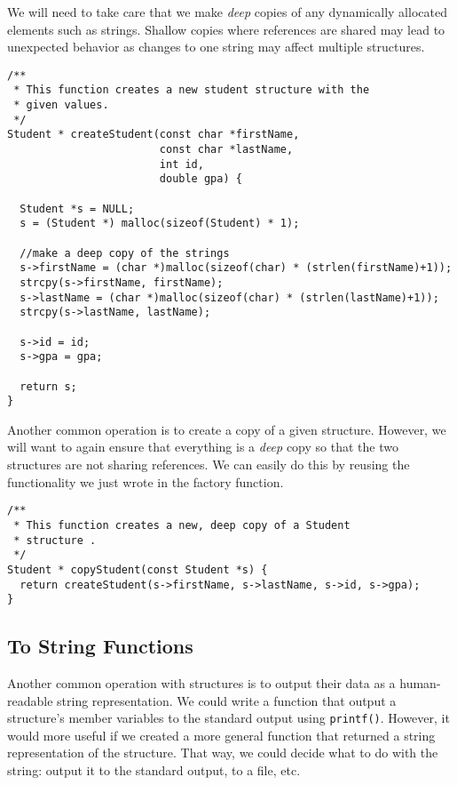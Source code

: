 We will need to take care that we make \emph{deep} copies of 
any dynamically allocated elements such as strings.  Shallow
copies where references are shared may lead to unexpected 
behavior as changes to one string may affect multiple structures.

\begin{verbatim}
/**
 * This function creates a new student structure with the
 * given values.
 */
Student * createStudent(const char *firstName, 
                        const char *lastName, 
                        int id, 
                        double gpa) {

  Student *s = NULL;
  s = (Student *) malloc(sizeof(Student) * 1);

  //make a deep copy of the strings
  s->firstName = (char *)malloc(sizeof(char) * (strlen(firstName)+1));
  strcpy(s->firstName, firstName);
  s->lastName = (char *)malloc(sizeof(char) * (strlen(lastName)+1));
  strcpy(s->lastName, lastName);

  s->id = id;
  s->gpa = gpa;

  return s;
}
\end{verbatim}

Another common operation is to create a copy of a given structure.
However, we will want to again ensure that everything is a \emph{deep}
copy so that the two structures are not sharing references.  We
can easily do this by reusing the functionality we just wrote in
the factory function.

\begin{verbatim}
/**
 * This function creates a new, deep copy of a Student 
 * structure .
 */
Student * copyStudent(const Student *s) {
  return createStudent(s->firstName, s->lastName, s->id, s->gpa);
}
\end{verbatim}

\subsection{To String Functions}

Another common operation with structures is to output their data
as a human-readable string representation.  We could write
a function that output a structure's member variables to the standard
output using \texttt{printf()}.  However, it would more 
useful if we created a more general function that returned a 
string representation of the structure.  That way, we could decide
what to do with the string: output it to the standard output,
to a file, etc.

